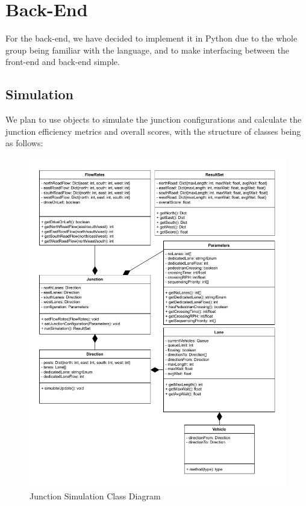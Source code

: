\documentclass{article}
\begin{document}
\section{Back-End}
For the back-end, we have decided to implement it in Python due to the whole group being familiar with the language, and to make 
interfacing between the front-end and back-end simple. 

\subsection{Simulation}

We plan to use objects to simulate the junction configurations and calculate 
the junction efficiency metrics and overall scores, with the structure of classes being as follows:

\begin{figure}[H]
    \centering
    \includegraphics[width=1\linewidth]{JunctionSimulationClassDiagram.drawio.pdf}
    \caption{Junction Simulation Class Diagram}
    \label{class diagram}
\end{figure}
\end{document}
